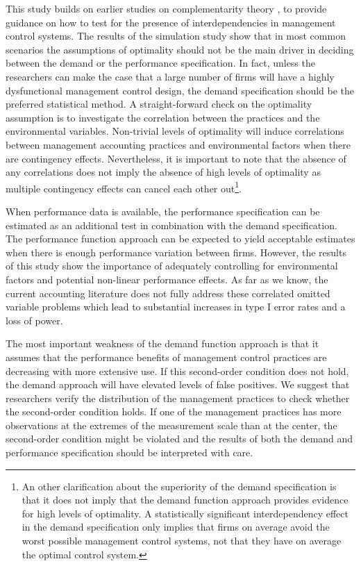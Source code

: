 \documentclass[12pt]{article}
\begin{document}
This study builds on earlier studies on complementarity theory
\citep{Milgrom1995, Grabner2013}, to provide guidance on how to test for
the presence of interdependencies in management control systems. The
results of the simulation study show that in most common scenarios the
assumptions of optimality should not be the main driver in deciding
between the demand or the performance specification. In fact, unless the
researchers can make the case that a large number of firms will have a
highly dysfunctional management control design, the demand specification
should be the preferred statistical method. A straight-forward check on
the optimality assumption is to investigate the correlation between the
practices and the environmental variables. Non-trivial levels of
optimality will induce correlations between management accounting
practices and environmental factors when there are contingency effects.
Nevertheless, it is important to note that the absence of any
correlations does not imply the absence of high levels of optimality as
multiple contingency effects can cancel each other out\footnote{An other
  clarification about the superiority of the demand specification is
  that it does not imply that the demand function approach provides
  evidence for high levels of optimality. A statistically significant
  interdependency effect in the demand specification only implies that
  firms on average avoid the worst possible management control systems,
  not that they have on average the optimal control system.}.

When performance data is available, the performance specification can be
estimated as an additional test in combination with the demand
specification. The performance function approach can be expected to
yield acceptable estimates when there is enough performance variation
between firms. However, the results of this study show the importance of
adequately controlling for environmental factors and potential
non-linear performance effects. As far as we know, the current
accounting literature does not fully address these correlated omitted
variable problems which lead to substantial increases in type I error
rates and a loss of power.

The most important weakness of the demand function approach is that it
assumes that the performance benefits of management control practices
are decreasing with more extensive use. If this second-order condition
does not hold, the demand approach will have elevated levels of false
positives. We suggest that researchers verify the distribution of the
management practices to check whether the second-order condition holds.
If one of the management practices has more observations at the extremes
of the measurement scale than at the center, the second-order condition
might be violated and the results of both the demand and performance
specification should be interpreted with care.
\end{document}

